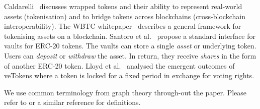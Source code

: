 Caldarelli~\cite{caldarelli-21} discusses wrapped tokens and their
ability to represent real-world assets (tokenisation) and to bridge
tokens across blockchains (cross-blockchain interoperability).  The
WBTC whitepaper~\cite{kyber-et-al-xx} describes a general framework
for tokenising assets on a blockchain.  Santoro et
al.~\cite{santoro-et-al-22} propose a standard interface for vaults
for ERC-20 tokens.  The vaults can store a single \textit{asset} or
underlying token.  Users can \textit{deposit} or \textit{withdraw} the
asset.  In return, they receive \textit{shares} in the form of another
ERC-20 token.  Lloyd et al.~\cite{lloyd-et-al-23} analysed the
emergent outcomes of veTokens where a token is locked for a fixed
period in exchange for voting rights.

We use common terminology from graph theory through-out the paper.
Please refer to \cite{diestel-17} or a similar reference for
definitions.

